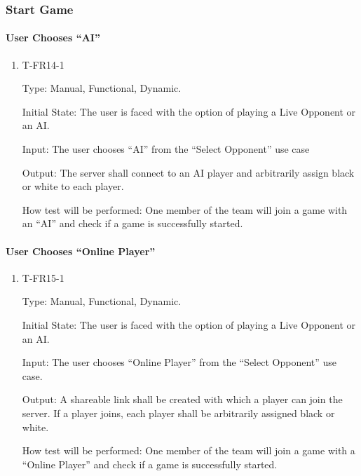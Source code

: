 \documentclass[12pt, titlepage]{article}
\begin{document}
\subsubsection{Start Game}

    \paragraph{User Chooses ``AI''}

        \begin{enumerate}

        \item{T-FR14-1\\}

            Type: Manual, Functional, Dynamic.
            					
            Initial State: The user is faced with the option of playing a Live Opponent or an AI.
            					
            Input: The user chooses ``AI'' from the ``Select Opponent'' use case
            					
            Output: The server shall connect to an AI
            player and arbitrarily assign black or white to each player.

            How test will be performed: One member of the team will join a game with an ``AI'' and check if a game is successfully started.

        \end{enumerate}

    \paragraph{User Chooses ``Online Player''}

        \begin{enumerate}

        \item{T-FR15-1\\}

            Type: Manual, Functional, Dynamic.
            					
            Initial State: The user is faced with the option of playing a Live Opponent or an AI.
            					
            Input: The user chooses ``Online Player'' from the “Select Opponent” use case.
            					
            Output: A shareable link shall be
            created with which a player can join the server. If a player joins, each player shall be arbitrarily
            assigned black or white.

            How test will be performed: One member of the team will join a game with a ``Online Player'' and check if a game is successfully started.

        \end{enumerate}
            
\end{document}

